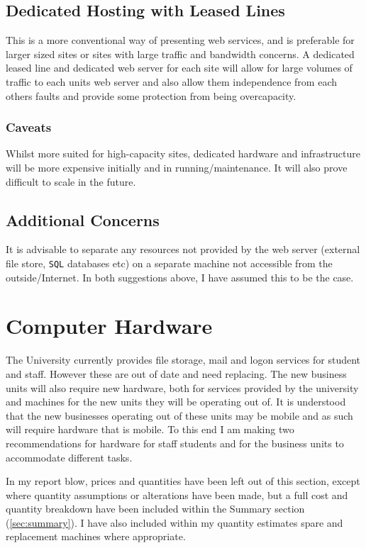 \documentclass[10pt]{article}
\begin{document}
        \subsection{Dedicated Hosting with Leased Lines}
            This is a more conventional way of presenting web services, and is preferable for larger sized sites or sites with large traffic and bandwidth concerns. A dedicated leased line and dedicated web server for each site will allow for large volumes of traffic to each units web server and also allow them independence from each others faults and provide some protection from being overcapacity. 

            \subsubsection{Caveats}
                Whilst more suited for high-capacity sites, dedicated hardware and infrastructure will be more expensive initially and in running/maintenance. It will also prove difficult to scale in the future.

        \subsection{Additional Concerns}
            It is advisable to separate any resources not provided by the web server (external file store, \texttt{SQL} databases etc) on a separate machine not accessible from the outside/Internet. In both suggestions above, I have assumed this to be the case.

    \section{Computer Hardware}
        \label{sec:hardware}
        The University currently provides file storage, mail and logon services for student and staff. However these are out of date and need replacing. The new business units will also require new hardware, both for services provided by the university and machines for the new units they will be operating out of. It is understood that the new businesses operating out of these units may be mobile and as such will require hardware that is mobile. To this end I am making two recommendations for hardware for staff students and for the business units to accommodate different tasks.

        In my report blow, prices and quantities have been left out of this section, except where quantity assumptions or alterations have been made, but a full cost and quantity breakdown have been included within the Summary section (\ref{sec:summary}). I have also included within my quantity estimates spare and replacement machines where appropriate.
\end{document}
